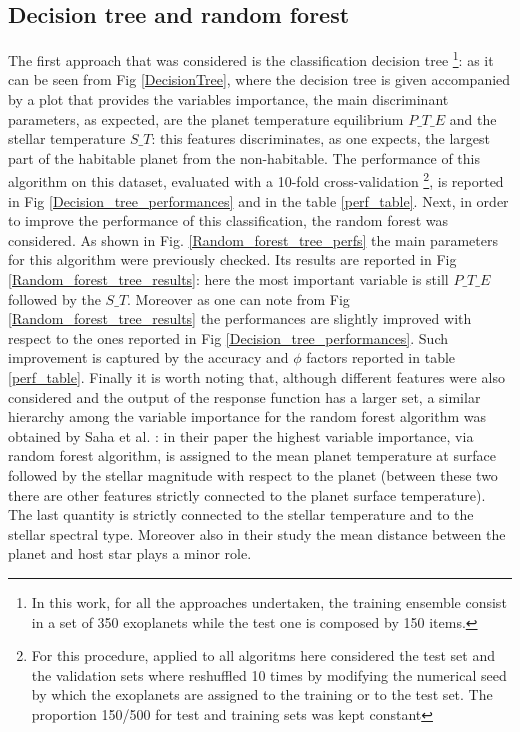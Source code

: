 \documentclass[
12pt, %
a4paper, %
oneside, %
headinclude,footinclude, %
BCOR5mm, %
]{scrartcl}
\begin{document}
\clearpage

\subsection{Decision tree and random forest}
The first approach that was considered is the classification decision tree \footnote{In this work, for all the approaches undertaken, the training ensemble consist in a set of 350 exoplanets while the test one is composed by 150 items.}: as it can be seen from Fig \ref{DecisionTree}, where the decision tree is given accompanied by a plot that provides the variables importance,  the main discriminant parameters, as expected, are the planet temperature equilibrium $P\_T\_E$ and the stellar temperature $S\_T$: this features discriminates, as one expects, the largest part of the habitable planet from the non-habitable. The performance of this algorithm on this dataset, evaluated with a 10-fold cross-validation \footnote{For this procedure, applied to all algoritms here considered the test set and the validation sets where reshuffled 10 times by modifying the numerical seed by which the exoplanets are assigned to the training or to the test set. The proportion 150/500 for test and training sets was kept constant}, is reported in Fig \ref{Decision_tree_performances} and in the table \ref{perf_table}. Next, in order to improve the performance of this classification, the random forest was considered. As shown in Fig. \ref{Random_forest_tree_perfs} the main parameters for this algorithm were previously checked. Its results are reported in Fig \ref{Random_forest_tree_results}: here the most important variable is still $P\_T\_E$ followed by the $S\_T$.  Moreover  as one can note from Fig \ref{Random_forest_tree_results} the performances are slightly improved with respect to the ones reported in Fig \ref{Decision_tree_performances}.  Such improvement is captured by the accuracy and $\phi$ factors reported in table \ref{perf_table}. Finally it is worth noting that, although  different features were also considered and the output of the response function has a larger set,  a similar hierarchy  among the variable importance for the random forest algorithm was obtained by Saha et al. \cite{saha2018machine}: in their paper the highest variable importance, via random forest algorithm,  is assigned to the mean planet temperature at surface followed by the stellar magnitude with respect to the planet (between these two there are other features strictly connected to the planet surface temperature). The last quantity is strictly connected to the stellar temperature and to the stellar spectral type. Moreover also in their study the mean distance between the planet and host star plays a minor role.
\end{document}
